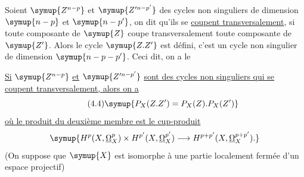 Soient $\symup{Z^{n-p}}$ et $\symup{Z'^{n-p'}}$ des cycles non singuliers de dimension $\symup{n-p}$ et
$\symup{n-p'}$, on dit qu'ils se \uline{coupent transversalement}, si toute composante
de $\symup{Z}$ coupe transversalement toute composante de $\symup{Z'}$. Alors le cycle $\symup{Z.Z'}$ est
défini, c'est un cycle non singulier de dimension $\symup{n-p-p'}$. Ceci dit, on a le

 \uline{Si} $\symup{Z^{n-p}}$ \uline{et} $\symup{Z'^{n-p'}}$ \uline{sont des cycles non singuliers
qui se coupent transversalement, alors on a}
\begin{equation}\tag{4.4}
  \symup{P_X(Z.Z')=P_X(Z).P_X(Z')}
\end{equation}
\uline{où le produit du deuxième membre est le cup-produit}
\[
  \symup{H^{p}(X,\underline{\Omega}_X^{p})\times H^{p'}(X,\underline{\Omega}_X^{p'})
  \longrightarrow H^{p+p'}(X,\underline{\Omega}_X^{p+p'}).}
\]
(On suppose que $\symup{X}$ est isomorphe à une partie localement fermée d'un espace
projectif)

